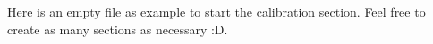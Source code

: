 Here is an empty file as example to start the calibration section.
Feel free to create as many sections as necessary :D.

